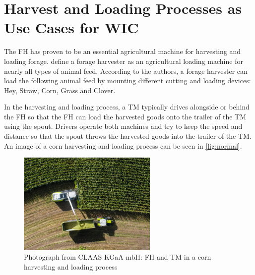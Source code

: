 \section[Use Cases for \acl{WIC}]{Harvest and Loading Processes as Use Cases for \acl{WIC}}
\label{sec:corn_harvest_scenario}
The \ac{FH} has proven to be an essential agricultural machine for harvesting and loading forage. \textcite{seifert_feldhacksler_1962} define a forage harvester as an agricultural loading machine for nearly all types of animal feed. According to the authors, a forage harvester can load the following animal feed by mounting different cutting and loading devices: Hey, Straw, Corn, Grass and Clover.

In the harvesting and loading process, a \ac{TM} typically drives alongside or behind the \ac{FH} so that the \ac{FH} can load the harvested goods onto the trailer of the \ac{TM} using the spout. Drivers operate both machines and try to keep the speed and distance so that the spout throws the harvested goods into the trailer of the TM. An image of a corn harvesting and loading process can be seen in \autoref{fig:normal}.

\begin{figure}[H]%
   \centering
   \includegraphics[width=0.6\textwidth]{Latex/figures/claas_harvest_side.png}
   \caption{Photograph from CLAAS KGaA mbH: \acf{FH} and \acf{TM} in a corn harvesting and loading process}%
   \label{fig:normal}%
\end{figure}

